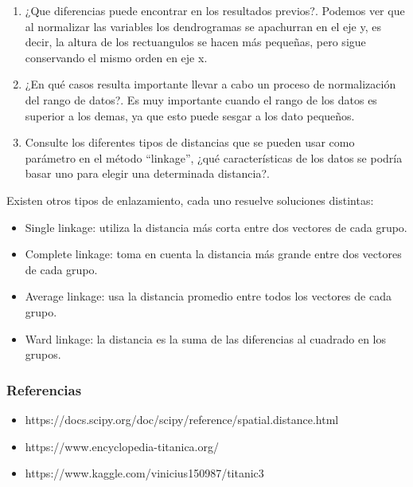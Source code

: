 \documentclass[11pt]{article}
\providecommand{\tightlist}{%
      \setlength{\itemsep}{0pt}\setlength{\parskip}{0pt}}
\begin{document}
    \begin{enumerate}
\def\labelenumi{\roman{enumi})}
\item
  ¿Que diferencias puede encontrar en los resultados previos?. Podemos
  ver que al normalizar las variables los dendrogramas se apachurran en
  el eje y, es decir, la altura de los rectuangulos se hacen más
  pequeñas, pero sigue conservando el mismo orden en eje x.
\item
  ¿En qué casos resulta importante llevar a cabo un proceso de
  normalización del rango de datos?. Es muy importante cuando el rango
  de los datos es superior a los demas, ya que esto puede sesgar a los
  dato pequeños.
\item
  Consulte los diferentes tipos de distancias que se pueden usar como
  parámetro en el método ``linkage'', ¿qué características de los datos
  se podría basar uno para elegir una determinada distancia?.
\end{enumerate}

Existen otros tipos de enlazamiento, cada uno resuelve soluciones
distintas:

\begin{itemize}
\tightlist
\item
  Single linkage: utiliza la distancia más corta entre dos vectores de
  cada grupo.
\item
  Complete linkage: toma en cuenta la distancia más grande entre dos
  vectores de cada grupo.
\item
  Average linkage: usa la distancia promedio entre todos los vectores de
  cada grupo.
\item
  Ward linkage: la distancia es la suma de las diferencias al cuadrado
  en los grupos.
\end{itemize}

    \hypertarget{referencias}{%
\subsubsection{Referencias}\label{referencias}}

\begin{itemize}
\tightlist
\item
  https://docs.scipy.org/doc/scipy/reference/spatial.distance.html
\item
  https://www.encyclopedia-titanica.org/
\item
  https://www.kaggle.com/vinicius150987/titanic3
\end{itemize}


    
    
    
\end{document}
